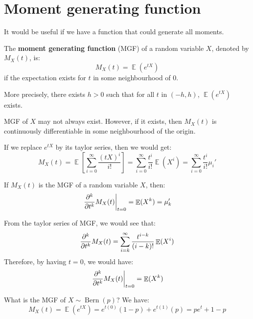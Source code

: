 \documentclass{huhtakm-template-book-v2}
\DeclareMathOperator{\E}{\mathbb{E}}
\DeclareMathOperator{\Bern}{Bern}
\begin{document}
\section{Moment generating function}
It would be useful if we have a function that could generate all moments.
\begin{defn}
	The \textbf{moment generating function} (MGF) of a random variable $X$, denoted by $M_{X}(t)$, is:
	\begin{equation*}
		M_{X}(t)=\E(e^{tX})
	\end{equation*}
	if the expectation exists for $t$ in some neighbourhood of $0$.
\end{defn}
\begin{rem}
	More precisely, there exists $h>0$ such that for all $t$ in $(-h,h)$, $\E(e^{tX})$ exists.
\end{rem}
\begin{rem}
	MGF of $X$ may not always exist. However, if it exists, then $M_{X}(t)$ is continuously differentiable in some neighbourhood of the origin.
\end{rem}
\begin{rem}
	If we replace $e^{tX}$ by its taylor series, then we would get:
	\begin{equation*}
		M_{X}(t)=\E\left[\sum_{i=0}^{\infty}\frac{(tX)^{i}}{i!}\right]=\sum_{i=0}^{\infty}\frac{t^{i}}{i!}\E(X^{i})=\sum_{i=0}^{\infty}\frac{t^{i}}{i!}\mu_{i}'
	\end{equation*}
\end{rem}
\begin{lem}
	If $M_{X}(t)$ is the MGF of a random variable $X$, then:
	\begin{equation*}
		\left.\pdv*[order={k}]{M_{X}(t)}{t}\right|_{t=0}=\E(X^{k})=\mu_{k}'
	\end{equation*}
\end{lem}
\begin{proofing}
	From the taylor series of MGF, we would see that:
	\begin{equation*}
		\pdv*[order={k}]{M_{X}(t)}{t}=\sum_{i=k}^{\infty}\frac{t^{i-k}}{(i-k)!}\E(X^{i})
	\end{equation*}
	Therefore, by having $t=0$, we would have:
	\begin{equation*}
		\left.\pdv*[order={k}]{M_{X}(t)}{t}\right|_{t=0}=\E(X^{k})
	\end{equation*}
\end{proofing}
\begin{eg}
	What is the MGF of $X\sim\Bern(p)$? We have:
	\begin{equation*}
		M_{X}(t)=\E(e^{tX})=e^{t(0)}(1-p)+e^{t(1)}(p)=pe^{t}+1-p
	\end{equation*}
\end{eg}
\end{document}
